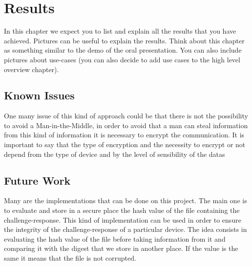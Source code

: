 \chapter{Results}
In this chapter we expect you to list and explain all the results that you have achieved. Pictures can be useful to explain the results. Think about this chapter as something similar to the demo of the oral presentation. You can also include pictures about use-cases (you can also decide to add use cases to the high level overview chapter).
\section{Known Issues}
One many issue of this kind of approach could be that there is not the possibility to avoid a Man-in-the-Middle, in order to avoid that a man can steal information from this kind of information it is necessary to encrypt the communication.
It is important to say that the type of encryption and the necessity to encrypt or not depend from the type of device and by the level of sensibility of the datas


\section{Future Work}
Many are the implementations that can be done on this project.
The main one is to evaluate and store in a secure place the hash value of the file containing the challenge-response.
This kind of implementation can be used in order to ensure the integrity of the challenge-response of a particular device.
The idea consists in evaluating the hash value of the file before taking information from it and comparing it with the digest that we store in another place.
If the value is the same it means that the file is not corrupted.
